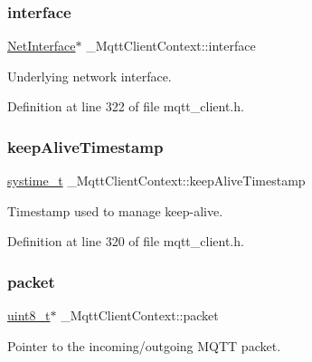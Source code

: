 \subsubsection{\texorpdfstring{interface}{interface}}
{\footnotesize\ttfamily \hyperlink{net_8h_a2234db8911a1148c9159979d8f5e0d6b}{Net\+Interface}$\ast$ \+\_\+\+Mqtt\+Client\+Context\+::interface}



Underlying network interface. 



Definition at line 322 of file mqtt\+\_\+client.\+h.

\mbox{\label{struct__MqttClientContext_aac5179408cb235331a71d1a32bcd09b8}} 
\subsubsection{\texorpdfstring{keep\+Alive\+Timestamp}{keepAliveTimestamp}}
{\footnotesize\ttfamily \hyperlink{compiler__port_8h_ae3e32a98d431a02106616da3071832dd}{systime\+\_\+t} \+\_\+\+Mqtt\+Client\+Context\+::keep\+Alive\+Timestamp}



Timestamp used to manage keep-\/alive. 



Definition at line 320 of file mqtt\+\_\+client.\+h.

\mbox{\label{struct__MqttClientContext_aaa6381cca1b61a980f72980bf860ccfa}} 
\subsubsection{\texorpdfstring{packet}{packet}}
{\footnotesize\ttfamily \hyperlink{stdint_8h_aba7bc1797add20fe3efdf37ced1182c5}{uint8\+\_\+t}$\ast$ \+\_\+\+Mqtt\+Client\+Context\+::packet}



Pointer to the incoming/outgoing M\+Q\+TT packet. 



